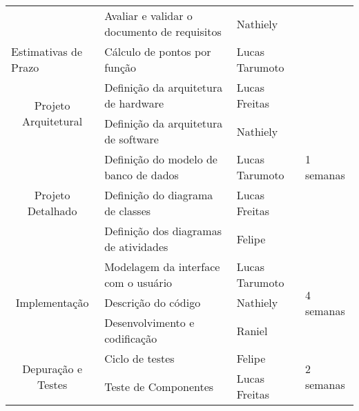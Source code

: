 \begin{longtable}[c]{|p{2em}|p{15em}|p{3em}|p{4em}|}
\cmidrule{2-3}         & \multicolumn{1}{p{10.055em}|}{Avaliar e validar o documento de requisitos} & \multicolumn{1}{p{5.89em}|}{Nathiely} & \multicolumn{1}{c|}{} \\
\cmidrule{1-3}    \multicolumn{1}{|p{9.11em}|}{Estimativas de Prazo} & \multicolumn{1}{p{10.055em}|}{Cálculo de pontos por função} & \multicolumn{1}{p{5.89em}|}{Lucas Tarumoto} & \multicolumn{1}{c|}{} \\
    \midrule
    \multicolumn{1}{|c|}{\multirow{2}[4]{*}{Projeto Arquitetural}} & \multicolumn{1}{p{10.055em}|}{Definição da arquitetura de hardware} & \multicolumn{1}{p{5.89em}|}{Lucas Freitas} & \multirow{5}[10]{*}{1 semanas} \\
\cmidrule{2-3}         & \multicolumn{1}{p{10.055em}|}{Definição da arquitetura de software} & \multicolumn{1}{p{5.89em}|}{Nathiely} & \multicolumn{1}{c|}{} \\
\cmidrule{1-3}    \multicolumn{1}{|c|}{\multirow{3}[6]{*}{Projeto Detalhado}} & \multicolumn{1}{p{10.055em}|}{Definição do modelo de banco de dados} & \multicolumn{1}{p{5.89em}|}{Lucas Tarumoto} & \multicolumn{1}{c|}{} \\
\cmidrule{2-3}         & \multicolumn{1}{p{10.055em}|}{Definição do diagrama de classes} & \multicolumn{1}{p{5.89em}|}{Lucas Freitas} & \multicolumn{1}{c|}{} \\
\cmidrule{2-3}         & \multicolumn{1}{p{10.055em}|}{Definição dos diagramas de atividades} & \multicolumn{1}{p{5.89em}|}{Felipe} & \multicolumn{1}{c|}{} \\
    \midrule
    \multicolumn{1}{|c|}{\multirow{3}[6]{*}{Implementação}} & \multicolumn{1}{p{10.055em}|}{Modelagem da interface com o usuário} & \multicolumn{1}{p{5.89em}|}{Lucas Tarumoto} & \multirow{3}[6]{*}{4 semanas} \\
\cmidrule{2-3}         & \multicolumn{1}{p{10.055em}|}{Descrição do código} & \multicolumn{1}{p{5.89em}|}{Nathiely} & \multicolumn{1}{c|}{} \\
\cmidrule{2-3}         & \multicolumn{1}{p{10.055em}|}{Desenvolvimento e codificação} & \multicolumn{1}{p{5.89em}|}{Raniel} & \multicolumn{1}{c|}{} \\
    \midrule
    \multicolumn{1}{|c|}{\multirow{4}[8]{*}{Depuração e Testes}} & \multicolumn{1}{p{10.055em}|}{Ciclo de testes} & \multicolumn{1}{p{5.89em}|}{Felipe} & \multirow{4}[8]{*}{2 semanas} \\
\cmidrule{2-3}         & \multicolumn{1}{p{10.055em}|}{Teste de Componentes} & \multicolumn{1}{p{5.89em}|}{Lucas Freitas} & \multicolumn{1}{c|}{} \\

\end{longtable}
